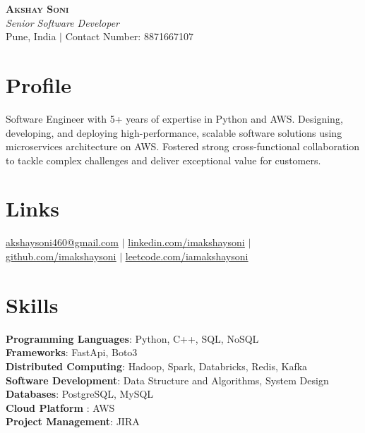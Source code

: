 \documentclass[letterpaper,11pt]{article}
\begin{document}

\begin{center}
    \textbf{\Huge \scshape  Akshay Soni} \\ \vspace{1pt}
    \small \textit{Senior Software Developer } \\
    Pune, India $|$ {Contact Number: 8871667107}
\end{center}

\section*{Profile}
Software Engineer with 5+ years of expertise in Python and AWS. Designing, developing, and deploying high-performance, scalable software solutions using microservices architecture on AWS. Fostered strong cross-functional collaboration to tackle complex challenges and deliver exceptional value for customers. 

\section{Links}
 \small { \href{mailto:akshaysoni460@gmail.com}{\underline{akshaysoni460@gmail.com}} $|$
  \href{https://www.linkedin.com/in/imakshaysoni}{\underline{linkedin.com/imakshaysoni}} $|$
    \href{https://github.com/imakshaysoni}{\underline{github.com/imakshaysoni}} $|$
     \href{https://leetcode.com/iamakshaysoni}{\underline{leetcode.com/iamakshaysoni}} 
    }

\section{Skills}
 \begin{itemize}[leftmargin=0.15in, label={}]
    \small{\item{
     \textbf{Programming Languages}{: Python, C++, SQL, NoSQL} \\
     \textbf{Frameworks}{: FastApi, Boto3} \\   
\textbf{Distributed Computing}{: Hadoop, Spark, Databricks, Redis, Kafka} \\
     \textbf{Software Development}{: Data Structure and Algorithms, System Design} \\  \textbf{Databases}{: PostgreSQL, MySQL} \\\textbf{Cloud Platform }{: AWS }\\
     \textbf{Project Management}{: JIRA}
    }}
 \end{itemize}
\end{document}
